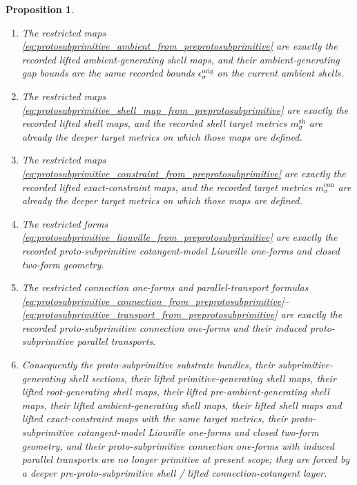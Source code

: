 \documentclass[11pt]{article}
\newcommand{\ShellMetric}[1]{m_{#1}^{\mathrm{sh}}}
\newcommand{\ConstraintMetric}[1]{m_{#1}^{\mathrm{con}}}
\newcommand{\OriginGap}[1]{\epsilon_{#1}^{\mathrm{orig}}}
\newtheorem{proposition}{Proposition}
\begin{document}
\begin{proposition}
\begin{enumerate}
    \item The restricted maps \eqref{eq:protosubprimitive_ambient_from_preprotosubprimitive} are exactly the recorded lifted ambient-generating shell maps, and their ambient-generating gap bounds are the same recorded bounds \(\OriginGap{\sigma}\) on the current ambient shells.
    \item The restricted maps \eqref{eq:protosubprimitive_shell_map_from_preprotosubprimitive} are exactly the recorded lifted shell maps, and the recorded shell target metrics \(\ShellMetric{\sigma}\) are already the deeper target metrics on which those maps are defined.
    \item The restricted maps \eqref{eq:protosubprimitive_constraint_from_preprotosubprimitive} are exactly the recorded lifted exact-constraint maps, and the recorded target metrics \(\ConstraintMetric{\sigma}\) are already the deeper target metrics on which those maps are defined.
    \item The restricted forms \eqref{eq:protosubprimitive_liouville_from_preprotosubprimitive} are exactly the recorded proto-subprimitive cotangent-model Liouville one-forms and closed two-form geometry.
    \item The restricted connection one-forms and parallel-transport formulas \eqref{eq:protosubprimitive_connection_from_preprotosubprimitive}--\eqref{eq:protosubprimitive_transport_from_preprotosubprimitive} are exactly the recorded proto-subprimitive connection one-forms and their induced proto-subprimitive parallel transports.
    \item Consequently the proto-subprimitive substrate bundles, their subprimitive-generating shell sections, their lifted primitive-generating shell maps, their lifted root-generating shell maps, their lifted pre-ambient-generating shell maps, their lifted ambient-generating shell maps, their lifted shell maps and lifted exact-constraint maps with the same target metrics, their proto-subprimitive cotangent-model Liouville one-forms and closed two-form geometry, and their proto-subprimitive connection one-forms with induced parallel transports are no longer primitive at present scope; they are forced by a deeper pre-proto-subprimitive shell / lifted connection-cotangent layer.
\end{enumerate}
\end{proposition}
\end{document}

